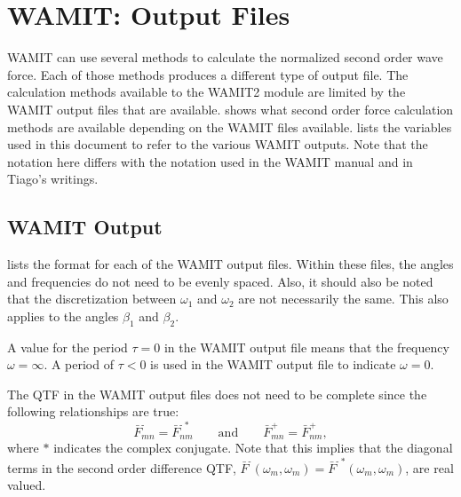\chapter{WAMIT: Output Files}
\label{chap:WamitOutput}




WAMIT can use several methods to calculate the normalized second order wave force.  Each of those methods produces a different type of output file.  The calculation methods available to the WAMIT2 module are limited by the WAMIT output files that are available.   shows what second order force calculation methods are available depending on the WAMIT files available\cite{WAMIT}.
 lists the variables used in this document to refer to the various WAMIT outputs.  Note that the notation here differs with the notation used in the WAMIT manual and in Tiago's writings\cite{duarte:2014,WAMIT}.

\section{WAMIT Output}
 lists the format for each of the WAMIT output files.
Within these files, the angles and frequencies do not need to be evenly spaced.  Also, it should also be noted that the discretization between $\omega_1$ and $\omega_2$ are not necessarily the same.  This also applies to the angles $\beta_1$ and $\beta_2$.

A value for the period $\tau = 0$ in the WAMIT output file means that the frequency $\omega = \infty$.  A period of $\tau < 0$ is used in the WAMIT output file to indicate $\omega = 0$.

The QTF in the WAMIT output files does not need to be complete since the following relationships are true:
\begin{equation}
   \bar{F}^\text{-}_{mn} = \bar{F}^{\text{-}~*}_{nm}   \qquad \text{and} \qquad   \bar{F}^{+}_{mn} = \bar{F}^{+}_{nm},
\label{eq:WAMIT:QTF_sym}
\end{equation}
where $*$ indicates the complex conjugate.  Note that this implies that the diagonal terms in the second order difference QTF, $\bar{F}^\text{-} (\omega_m,\omega_m) =\bar{F}^{\text{-}~*} (\omega_m,\omega_m)$, are real valued.

